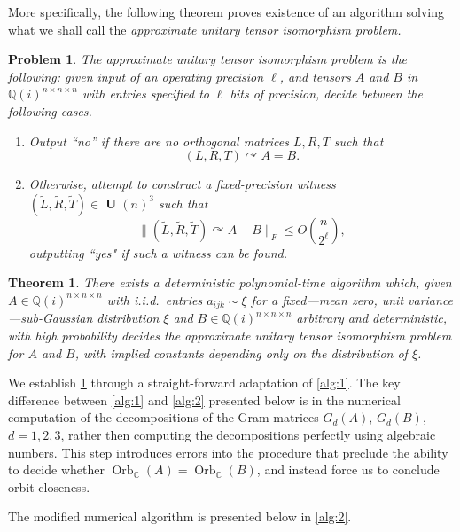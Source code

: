 \documentclass[11pt]{article}
\numberwithin{equation}{section}
\newtheorem{theorem}{Theorem}[section]
\newtheorem{problem}{\bf Problem}
\theoremstyle{remark}
\DeclareMathOperator{\Orb}{Orb}
\DeclareMathOperator{\Unitary}{\textbf{U}}
\newcommand{\CC}{\mathbb{C}}
\newcommand{\QQ}{\mathbb{Q}}
\begin{document}
More specifically, the following theorem proves existence of an algorithm solving what we shall call the \emph{approximate unitary tensor isomorphism problem.} 

\begin{problem}\label{prob-3}
    The \emph{approximate unitary tensor isomorphism problem} is the following: given input of an operating precision $\ell$, and tensors $A$ and $B$ in $\QQ(i)^{n\times n \times n}$ with entries specified to $\ell$ bits of precision, decide between the following cases. 
    \begin{enumerate}
        \item Output ``no'' if there are no orthogonal matrices $L, R, T$ such that
\[
(L, R, T) \curvearrowright A = B.
\]
\item Otherwise, attempt to construct a fixed-precision witness $(\widetilde{L}, \widetilde{R}, \widetilde{T}) \in \Unitary(n)^3$ such that
\[
\|(\widetilde{L}, \widetilde{R}, \widetilde{T})\curvearrowright A - B\|_F\leq O\left(\frac{n}{2^\ell}\right),
\]
outputting ``yes" if such a witness can be found.
    \end{enumerate}
\end{problem}


\begin{theorem}\label{thm:numericalUnitIso}
There exists a deterministic polynomial-time algorithm which, given $A\in\QQ(i)^{n\times n\times n}$ with i.i.d.\ entries $a_{ijk} \sim \xi$ for a fixed---mean zero, unit variance---sub-Gaussian distribution $\xi$ and $B\in\QQ(i)^{n\times n\times n}$ arbitrary and deterministic, with high probability decides the approximate unitary tensor isomorphism problem for $A$ and $B$, with implied constants depending only on the distribution of $\xi$.
\end{theorem}

We establish \cref{thm:numericalUnitIso} through a straight-forward adaptation of \cref{alg:1}. The key difference between \cref{alg:1} and \cref{alg:2} presented below is in the numerical computation of the decompositions of the Gram matrices $G_d(A)$, $G_d(B)$, $d=1,2,3$, rather then computing the decompositions perfectly using algebraic numbers. This step introduces errors into the procedure that preclude the ability to decide whether $\Orb_{\CC}(A) = \Orb_{\CC}(B)$, and instead force us to conclude orbit closeness.

The modified numerical algorithm is presented below in \cref{alg:2}.
\end{document}

